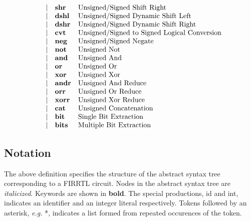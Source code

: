 \documentclass[12pt]{article}
\begin{document}
\[{\begin{array}{rrll}
              &\vert           &\text{\bf shr}            &\text{Unsigned/Signed Shift Right}\\
              &\vert           &\text{\bf dshl}           &\text{Unsigned/Signed Dynamic Shift Left}\\
              &\vert           &\text{\bf dshr}           &\text{Unsigned/Signed Dynamic Shift Right}\\
              &\vert           &\text{\bf cvt}            &\text{Unsigned/Signed to Signed Logical Conversion}\\
              &\vert           &\text{\bf neg}            &\text{Unsigned/Signed Negate}\\
              &\vert           &\text{\bf not}            &\text{Unsigned Not}\\
              &\vert           &\text{\bf and}            &\text{Unsigned And}\\
              &\vert           &\text{\bf or}             &\text{Unsigned Or}\\
              &\vert           &\text{\bf xor}            &\text{Unsigned Xor}\\
              &\vert           &\text{\bf andr}           &\text{Unsigned And Reduce}\\
              &\vert           &\text{\bf orr}            &\text{Unsigned Or Reduce}\\
              &\vert           &\text{\bf xorr}           &\text{Unsigned Xor Reduce}\\
              &\vert           &\text{\bf cat}            &\text{Unsigned Concatenation}\\
              &\vert           &\text{\bf bit}            &\text{Single Bit Extraction}\\
              &\vert           &\text{\bf bits}           &\text{Multiple Bit Extraction}\\
\end{array}
}
\]

\subsection{Notation}
The above definition specifies the structure of the abstract syntax tree corresponding to a FIRRTL circuit.
Nodes in the abstract syntax tree are {\em italicized}.
Keywords are shown in {\bf bold}.
The special productions, id and int, indicates an identifier and an integer literal respectively.
Tokens followed by an asterisk, {\em e.g.} *, indicates a list formed from repeated occurences of the token.
\end{document}
